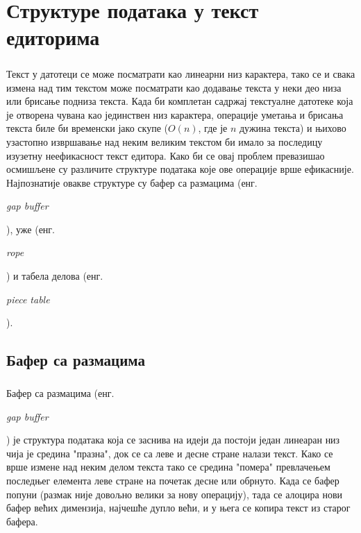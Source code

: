 \documentclass[12pt,oneside]{memoir}
\begin{document}
\chapter{Структуре података у текст едиторима}
\paragraph{}
Текст у датотеци се може посматрати као линеарни низ карактера, 
тако се и свака измена над тим текстом може посматрати као додавање текста у
неки део низа или брисање подниза текста. Када би комплетан садржај текстуалне датотеке
која је отворена чувана као јединствен низ карактера, операције уметања и брисања
текста биле би временски јако скупе (\(O(n)\), где је \(n\) дужина текста) и њихово узастопно
извршавање над неким великим текстом би имало за последицу изузетну неефикасност текст едитора.
Како би се овај проблем превазишао осмишљене су различите структуре података које ове операције
врше ефикасније. Најпознатије овакве структуре су бафер са размацима 
(енг. \begin{latinica}\textit{gap buffer}\end{latinica}), уже (енг. 
\begin{latinica}\textit{rope}\end{latinica}) и табела делова (енг. 
\begin{latinica}\textit{piece table}\end{latinica}).

\section{Бафер са размацима}
\paragraph{}
Бафер са размацима (енг. \begin{latinica}\textit{gap buffer}\end{latinica}) је структура
података која се заснива на идеји да постоји један линеаран низ чија је средина
"празна", док се са леве и десне стране налази текст. Како се врше измене над неким делом 
текста тако се средина "помера" превлачењем последњег елемента леве стране на почетак десне
или обрнуто. Када се бафер попуни (размак није довољно велики за нову операцију), тада се 
алоцира нови бафер већих димензија, најчешће дупло већи, и у њега се копира текст из старог
бафера.
\end{document}
